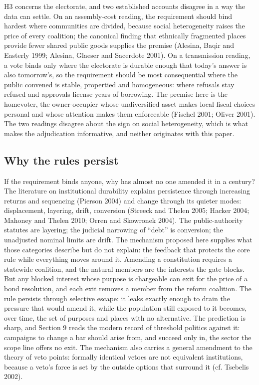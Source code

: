 H3 concerns the electorate, and two established accounts disagree in a way the data can settle. On an assembly-cost reading, the requirement should bind hardest where communities are divided, because social heterogeneity raises the price of every coalition; the canonical finding that ethnically fragmented places provide fewer shared public goods supplies the premise (Alesina, Baqir and Easterly 1999; Alesina, Glaeser and Sacerdote 2001). On a transmission reading, a vote binds only where the electorate is durable enough that today's answer is also tomorrow's, so the requirement should be most consequential where the public convened is stable, propertied and homogeneous: where refusals stay refused and approvals license years of borrowing. The premise here is the homevoter, the owner-occupier whose undiversified asset makes local fiscal choices personal and whose attention makes them enforceable (Fischel 2001; Oliver 2001). The two readings disagree about the sign on social heterogeneity, which is what makes the adjudication informative, and neither originates with this paper.

\subsection{Why the rules persist}
If the requirement binds anyone, why has almost no one amended it in a century? The literature on institutional durability explains persistence through increasing returns and sequencing (Pierson 2004) and change through its quieter modes: displacement, layering, drift, conversion (Streeck and Thelen 2005; Hacker 2004; Mahoney and Thelen 2010; Orren and Skowronek 2004). The public-authority statutes are layering; the judicial narrowing of ``debt'' is conversion; the unadjusted nominal limits are drift. The mechanism proposed here supplies what those categories describe but do not explain: the feedback that protects the core rule while everything moves around it. Amending a constitution requires a statewide coalition, and the natural members are the interests the gate blocks. But any blocked interest whose purpose is chargeable can exit for the price of a bond resolution, and each exit removes a member from the reform coalition. The rule persists through selective escape: it leaks exactly enough to drain the pressure that would amend it, while the population still exposed to it becomes, over time, the set of purposes and places with no alternative. The prediction is sharp, and Section 9 reads the modern record of threshold politics against it: campaigns to change a bar should arise from, and succeed only in, the sector the scope line offers no exit. The mechanism also carries a general amendment to the theory of veto points: formally identical vetoes are not equivalent institutions, because a veto's force is set by the outside options that surround it (cf. Tsebelis 2002).

